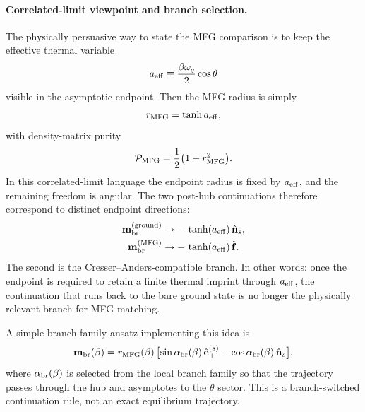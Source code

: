 \paragraph{Correlated-limit viewpoint and branch selection.}
The physically persuasive way to state the MFG comparison is to keep the effective thermal variable
\begin{equation}
    a_{\rm eff}\equiv \frac{\beta\omega_q}{2}\cos\theta
    \label{eq:tilt_sign_branch_aeff}
\end{equation}
visible in the asymptotic endpoint.  Then the MFG radius is simply
\begin{equation}
    r_{\rm MFG}=\tanh a_{\rm eff},
    \label{eq:tilt_sign_branch_rMFG_beta}
\end{equation}
with density-matrix purity
\begin{equation}
    \mathcal P_{\rm MFG}=\frac12\bigl(1+r_{\rm MFG}^2\bigr).
    \label{eq:tilt_sign_branch_PMFG_beta}
\end{equation}
In this correlated-limit language the endpoint radius is fixed by $a_{\rm eff}$, and the remaining freedom is
angular.  The two post-hub continuations therefore correspond to distinct endpoint directions:
\begin{align}
    \mathbf m_{\rm br}^{\rm(ground)} &\to -\,\tanh(a_{\rm eff})\,\hat{\mathbf n}_s,
    \label{eq:tilt_sign_branch_ground_endpoint_aeff}
    \\
    \mathbf m_{\rm br}^{\rm(MFG)} &\to -\,\tanh(a_{\rm eff})\,\hat{\mathbf f}.
    \label{eq:tilt_sign_branch_f_endpoint_aeff}
\end{align}
The second is the Cresser--Anders-compatible branch.  In other words: once the endpoint is required to retain a
finite thermal imprint through $a_{\rm eff}$, the continuation that runs back to the bare ground state is no
longer the physically relevant branch for MFG matching.

A simple branch-family ansatz implementing this idea is
\begin{equation}
    \mathbf m_{\rm br}(\beta)
    =
    r_{\rm MFG}(\beta)\,
    \bigl[\sin\alpha_{\rm br}(\beta)\,\hat{\mathbf e}_{\perp}^{(s)}
          -\cos\alpha_{\rm br}(\beta)\,\hat{\mathbf n}_{s}\bigr],
    \label{eq:tilt_sign_branch_mfg_guided_ansatz}
\end{equation}
where $\alpha_{\rm br}(\beta)$ is selected from the local branch family so that the trajectory passes through the
hub and asymptotes to the $\theta$ sector.  This is a branch-switched continuation rule, not an exact
equilibrium trajectory.

